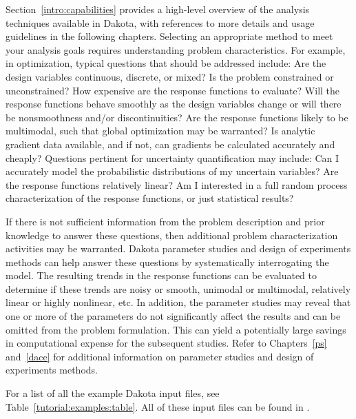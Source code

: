 Section~\ref{intro:capabilities} provides a high-level overview of the
analysis techniques available in Dakota, with references to more
details and usage guidelines in the following chapters.  Selecting an
appropriate method to meet your analysis goals requires understanding
problem characteristics.  For example, in optimization, typical
questions that should be addressed include: Are the design variables
continuous, discrete, or mixed? Is the problem constrained or
unconstrained? How expensive are the response functions to evaluate?
Will the response functions behave smoothly as the design variables
change or will there be nonsmoothness and/or discontinuities? Are the
response functions likely to be multimodal, such that global
optimization may be warranted? Is analytic gradient data available,
and if not, can gradients be calculated accurately and cheaply?
Questions pertinent for uncertainty quantification may include: Can I
accurately model the probabilistic distributions of my uncertain
variables? Are the response functions relatively linear? Am I
interested in a full random process characterization of the response
functions, or just statistical results?

If there is not sufficient information from the problem description
and prior knowledge to answer these questions, then additional problem
characterization activities may be warranted. Dakota parameter studies
and design of experiments methods can help answer these questions by
systematically interrogating the model.  The resulting trends in the
response functions can be evaluated to determine if these trends are
noisy or smooth, unimodal or multimodal, relatively linear or highly
nonlinear, etc. In addition, the parameter studies may reveal that one
or more of the parameters do not significantly affect the results and
can be omitted from the problem formulation. This can yield a
potentially large savings in computational expense for the subsequent
studies. Refer to Chapters~\ref{ps} and~\ref{dace} for additional
information on parameter studies and design of experiments methods.

For a list of all the example Dakota input files, see 
Table~\ref{tutorial:examples:table}. All of these input files 
can be found in .

